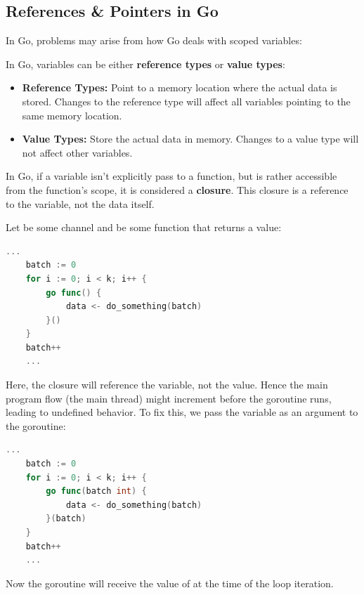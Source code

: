 \subsection{References \& Pointers in Go}

\noindent
In Go, problems may arise from how Go deals with scoped variables:
\begin{Def}

    In Go, variables can be either \textbf{reference types} or \textbf{value types}:
    \begin{itemize}
        \item \textbf{Reference Types:} Point to a memory location where the actual data is stored. Changes to the reference type will affect all variables pointing to the same memory location.
        \item \textbf{Value Types:} Store the actual data in memory. Changes to a value type will not affect other variables.
    \end{itemize}
\end{Def}

\begin{Def}

    In Go, if a variable isn't explicitly pass to a function, but is rather accessible from the function's scope, it is considered a \textbf{closure}. This 
    closure is a reference to the variable, not the data itself.
\end{Def}

\newpage 

\begin{Example}

    Let  be some channel and  be some function that returns a value:

    \begin{lstlisting}[language=Go, numbers= none]
    ...
    batch := 0
    for i := 0; i < k; i++ {
        go func() {
            data <- do_something(batch)
        }()
    }
    batch++
    ...
    \end{lstlisting}

    \noindent
    Here, the  closure will reference the  variable, not the value. Hence the main program flow (the main thread) might increment  
    before the goroutine runs, leading to undefined behavior. To fix this, we pass the variable as an argument to the goroutine:

    \begin{lstlisting}[language=Go, numbers= none]
    ...
    batch := 0
    for i := 0; i < k; i++ {
        go func(batch int) {
            data <- do_something(batch)
        }(batch)
    }
    batch++
    ...
    \end{lstlisting}

    \noindent
    Now the goroutine will receive the value of  at the time of the loop iteration.
\end{Example}
    
